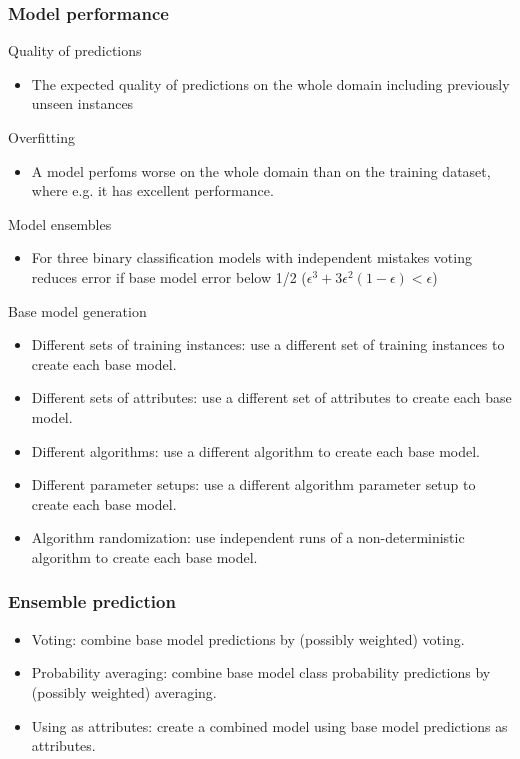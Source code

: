 \documentclass{beamer}
\begin{document}
\begin{frame}
\frametitle{Model performance}
\begin{block}{Quality of predictions}
\begin{itemize}
\item The expected quality of predictions on the whole domain including previously unseen instances
\end{itemize}
\end{block}
\begin{block}{Overfitting}
\begin{itemize}
\item A model perfoms worse on the whole domain than on the training dataset, where e.g. it has excellent performance.
\end{itemize}
\end{block}
\end{frame}

\begin{frame}
\begin{block}{Model ensembles}
\begin{itemize}
\item For three binary classification models with independent mistakes voting reduces error if base model error below 1/2 ($\epsilon^3+3\epsilon^2(1-\epsilon)<\epsilon$)
\end{itemize}
\end{block}
\begin{block}{Base model generation}
\begin{itemize}
\item Different sets of training instances: use a different set of training instances to create each base model.
\item Different sets of attributes: use a different set of attributes to create each base model.
\item Different algorithms: use a different algorithm to create each base model.
\item Different parameter setups: use a different algorithm parameter setup to create each base model.
\item Algorithm randomization: use independent runs of a non-deterministic algorithm to create each base model.
\end{itemize}
\end{block}
\end{frame}

\begin{frame}
\frametitle{Ensemble prediction}
\begin{block}{}
\begin{itemize}
\item Voting: combine base model predictions by (possibly weighted) voting.
\item Probability averaging: combine base model class probability predictions by (possibly weighted) averaging.
\item Using as attributes: create a combined model using base model predictions as attributes.
\end{itemize}
\end{block}
\end{frame}
\end{document}
